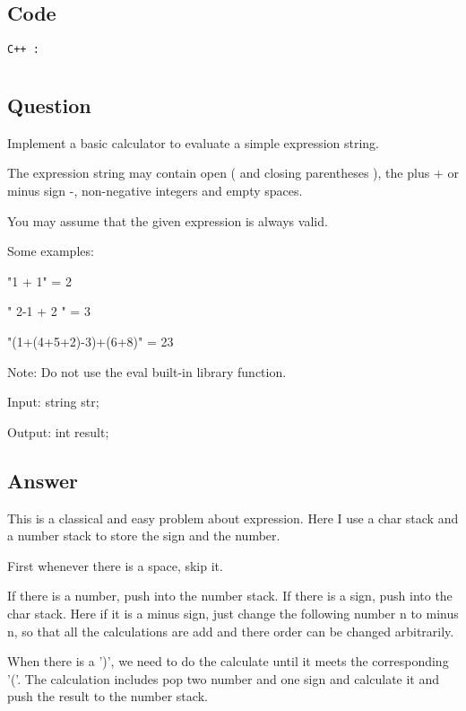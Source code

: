 \subsection{Code}
\texttt{C++ :}


\newpage
\section{}
\subsection{Question}
Implement a basic calculator to evaluate a simple expression string.

The expression string may contain open ( and closing parentheses ), the plus + or minus sign -, non-negative integers and empty spaces.

You may assume that the given expression is always valid.

Some examples:

"1 + 1" = 2

" 2-1 + 2 " = 3

"(1+(4+5+2)-3)+(6+8)" = 23

Note: Do not use the eval built-in library function.

Input: string str;

Output: int result;

\subsection{Answer}
This is a classical and easy problem about expression. Here I use a char stack and a number stack to store the sign and the number. 

First whenever there is a space, skip it.

If there is a number, push into the number stack. If there is a sign, push into the char stack. Here if it is a minus sign, just change the following number n to minus n, so that all the calculations are add and there order can be changed arbitrarily.

When there is a ')', we need to do the calculate until it meets the corresponding '('. The calculation includes pop two number and one sign and calculate it and push the result to the number stack.

